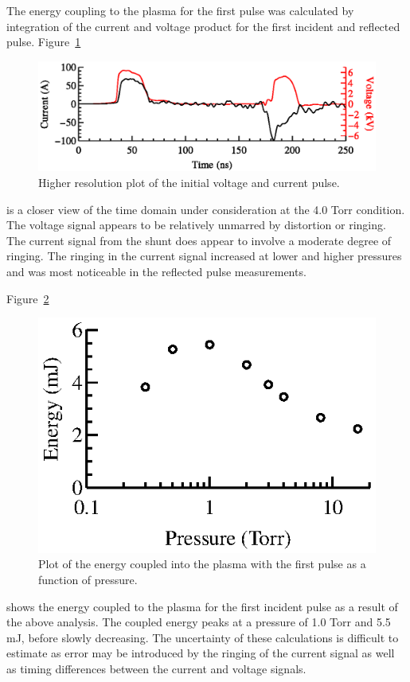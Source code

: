 The energy coupling to the plasma for the first pulse was calculated by
integration of the current and voltage product for the first incident and
reflected pulse. Figure~\ref{fig:energy}
\begin{figure}
  \centering
  \includegraphics{./chapters/experiment/figures/energy.eps}
  \caption{Higher resolution plot of the initial voltage and current pulse.}
  \label{fig:energy}
\end{figure}
is a closer view of the time domain under consideration at the 4.0 Torr
condition. The voltage signal appears to be relatively unmarred by distortion or
ringing. The current signal from the shunt does appear to involve a moderate
degree of ringing. The ringing in the current signal increased at lower and
higher pressures and was most noticeable in the reflected pulse measurements.

Figure~\ref{fig:energies}
\begin{figure}
  \centering
  \includegraphics{./chapters/experiment/figures/energies.eps}
  \caption{Plot of the energy coupled into the plasma with the first pulse as
  a function of pressure.}
  \label{fig:energies}
\end{figure}
shows the energy coupled to the plasma for the first incident pulse as a result
of the above analysis. The coupled energy peaks at a pressure of 1.0 Torr and
5.5 mJ, before slowly decreasing. The uncertainty of these calculations is
difficult to estimate as error may be introduced by the ringing of the current
signal as well as timing differences between the current and voltage signals. 

